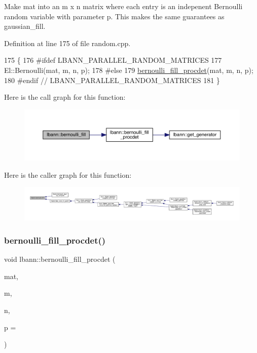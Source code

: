Make mat into an m x n matrix where each entry is an indepenent Bernoulli random variable with parameter p. This makes the same guarantees as gaussian\+\_\+fill. 

Definition at line 175 of file random.\+cpp.


\begin{DoxyCode}
175                                                                  \{
176 \textcolor{preprocessor}{#ifdef LBANN\_PARALLEL\_RANDOM\_MATRICES}
177   El::Bernoulli(mat, m, n, p);
178 \textcolor{preprocessor}{#else}
179   \hyperlink{namespacelbann_ad1e3fe84cfa5257be476de3be805064d}{bernoulli\_fill\_procdet}(mat, m, n, p);
180 \textcolor{preprocessor}{#endif  // LBANN\_PARALLEL\_RANDOM\_MATRICES  }
181 \}
\end{DoxyCode}
Here is the call graph for this function\+:\nopagebreak
\begin{figure}[H]
\begin{center}
\leavevmode
\includegraphics[width=350pt]{namespacelbann_ae8bc674a3d676391666524b44cbc4068_cgraph}
\end{center}
\end{figure}
Here is the caller graph for this function\+:\nopagebreak
\begin{figure}[H]
\begin{center}
\leavevmode
\includegraphics[width=350pt]{namespacelbann_ae8bc674a3d676391666524b44cbc4068_icgraph}
\end{center}
\end{figure}
\mbox{\label{namespacelbann_ad1e3fe84cfa5257be476de3be805064d}} 
\subsubsection{\texorpdfstring{bernoulli\+\_\+fill\+\_\+procdet()}{bernoulli\_fill\_procdet()}}
{\footnotesize\ttfamily void lbann\+::bernoulli\+\_\+fill\+\_\+procdet (\begin{DoxyParamCaption}\item[{\hyperlink{base_8hpp_a9a697a504ae84010e7439ffec862b470}{Abs\+Dist\+Mat} \&}]{mat,  }\item[{El\+::\+Int}]{m,  }\item[{El\+::\+Int}]{n,  }\item[{double}]{p = {} }\end{DoxyParamCaption})}

